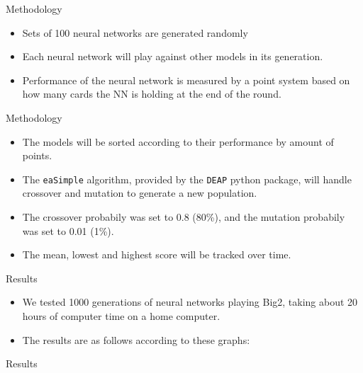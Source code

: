 \documentclass{beamer}
\begin{document}
\begin{frame}{Methodology}
	
	\begin{itemize}
	
		\item Sets of 100 neural networks are generated randomly
		\item Each neural network will play against other models in its generation.
		\item Performance of the neural network is measured by a point system based on how many cards the NN is holding at the end of the round.

	\end{itemize}
	
\end{frame}

\begin{frame}{Methodology}
	
	\begin{itemize}
		
		\item The models will be sorted according to their performance by amount of points.
		\item The \verb|eaSimple| algorithm, provided by the \texttt{DEAP} python package, will handle crossover and mutation to generate a new population.
		\item The crossover probabily was set to 0.8 (80\%), and the mutation probabily was set to 0.01 (1\%).
		\item The mean, lowest and highest score will be tracked over time.
		
	\end{itemize}
	
\end{frame}



\begin{frame}{Results}
	
	\begin{itemize}
		\item We tested 1000 generations of neural networks playing Big2, taking about 20 hours of computer time on a home computer.
		\item The results are as follows according to these graphs:
	\end{itemize}
	
\end{frame}

\begin{frame}{Results}
\end{frame}
\end{document}
